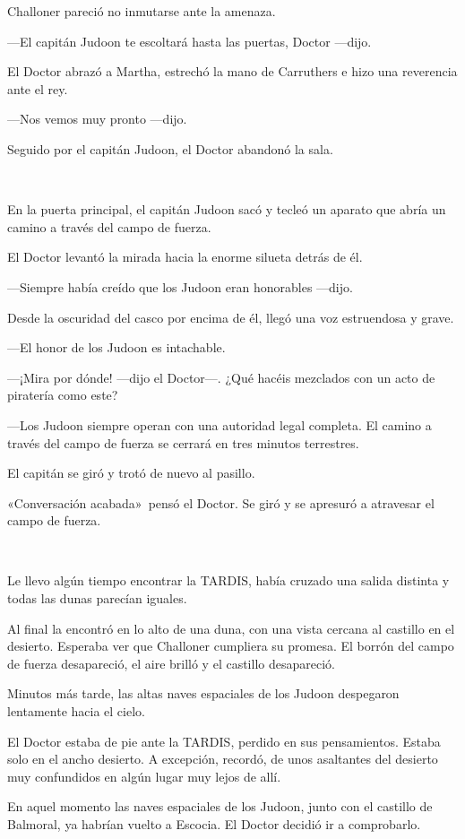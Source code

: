 Challoner pareció no inmutarse ante la amenaza.

---El capitán Judoon te escoltará hasta las puertas, Doctor ---dijo.

El Doctor abrazó a Martha, estrechó la mano de Carruthers e hizo una
reverencia ante el rey.

---Nos vemos muy pronto ---dijo.

Seguido por el capitán Judoon, el Doctor abandonó la sala.

~

En la puerta principal, el capitán Judoon sacó y tecleó un aparato que
abría un camino a través del campo de fuerza.

El Doctor levantó la mirada hacia la enorme silueta detrás de él.

---Siempre había creído que los Judoon eran honorables ---dijo.

Desde la oscuridad del casco por encima de él, llegó una voz estruendosa
y grave.

---El honor de los Judoon es intachable.

---¡Mira por dónde! ---dijo el Doctor---. ¿Qué hacéis mezclados con un
acto de piratería como este?

---Los Judoon siempre operan con una autoridad legal completa. El camino
a través del campo de fuerza se cerrará en tres minutos terrestres.

El capitán se giró y trotó de nuevo al pasillo.

«Conversación acabada»~pensó el Doctor. Se giró y se apresuró a
atravesar el campo de fuerza.

~

Le llevo algún tiempo encontrar la TARDIS, había cruzado una salida
distinta y todas las dunas parecían iguales.

Al final la encontró en lo alto de una duna, con una vista cercana al
castillo en el desierto. Esperaba ver que Challoner cumpliera su
promesa. El borrón del campo de fuerza desapareció, el aire brilló y el
castillo desapareció.

Minutos más tarde, las altas naves espaciales de los Judoon despegaron
lentamente hacia el cielo.

El Doctor estaba de pie ante la TARDIS, perdido en sus pensamientos.
Estaba solo en el ancho desierto. A excepción, recordó, de unos
asaltantes del desierto muy confundidos en algún lugar muy lejos de
allí.

En aquel momento las naves espaciales de los Judoon, junto con el
castillo de Balmoral, ya habrían vuelto a Escocia. El Doctor decidió ir
a comprobarlo.

